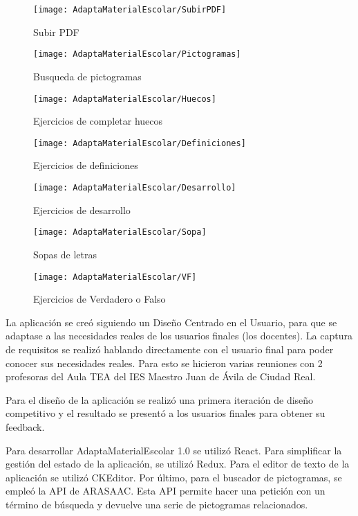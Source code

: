 \begin{figure}[ht!]
    \centering
    \texttt{[image:  AdaptaMaterialEscolar/SubirPDF]}
    \caption{Subir PDF}
    \label{SubirPDF}
\end{figure}
\begin{figure}[ht!]
    \centering
    \texttt{[image:  AdaptaMaterialEscolar/Pictogramas]}
    \caption{Busqueda de pictogramas}
    \label{Pictogramas}
\end{figure}
\begin{figure}[ht!]
    \centering
    \texttt{[image:  AdaptaMaterialEscolar/Huecos]}
    \caption{Ejercicios de completar huecos}
    \label{Huecos}
\end{figure}
\begin{figure}[ht!]
    \centering
    \texttt{[image:  AdaptaMaterialEscolar/Definiciones]}
    \caption{Ejercicios de definiciones}
    \label{Definiciones}
\end{figure}
\begin{figure}[ht!]
    \centering
    \texttt{[image:  AdaptaMaterialEscolar/Desarrollo]}
    \caption{Ejercicios de desarrollo}
    \label{Desarrollo}
\end{figure}
\begin{figure}[ht!]
    \centering
    \texttt{[image:  AdaptaMaterialEscolar/Sopa]}
    \caption{Sopas de letras}
    \label{Sopa}
\end{figure}
\begin{figure}[ht!]
    \centering
    \texttt{[image:  AdaptaMaterialEscolar/VF]}
    \caption{Ejercicios de Verdadero o Falso}
    \label{VF}
\end{figure}
La aplicación se creó siguiendo un Diseño Centrado en el Usuario, para que se adaptase a las necesidades reales de los usuarios finales (los docentes). La captura de requisitos se realizó hablando directamente con el usuario final para poder conocer sus necesidades reales. Para esto se hicieron varias reuniones con 2 profesoras del Aula TEA del IES Maestro Juan de Ávila de Ciudad Real.

Para el diseño de la aplicación se realizó una primera iteración de diseño competitivo y el resultado se presentó a los usuarios finales para obtener su feedback.

Para desarrollar AdaptaMaterialEscolar 1.0 se utilizó React. Para simplificar la gestión del estado de la aplicación, se utilizó Redux. Para el editor de texto de la aplicación se utilizó CKEditor. Por último, para el buscador de pictogramas, se empleó la API de ARASAAC. Esta API permite hacer una petición con un término de búsqueda y devuelve una serie de pictogramas relacionados.

